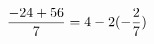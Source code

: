 \documentclass[preview]{standalone}
\begin{document}
\begin{align*}
\special{dvisvgm:raw <g id='unique000'>}\frac{-24 + 56}{7} = 4 - 2 (- \frac{2}{7})\special{dvisvgm:raw </g>}
\end{align*}
\end{document}

